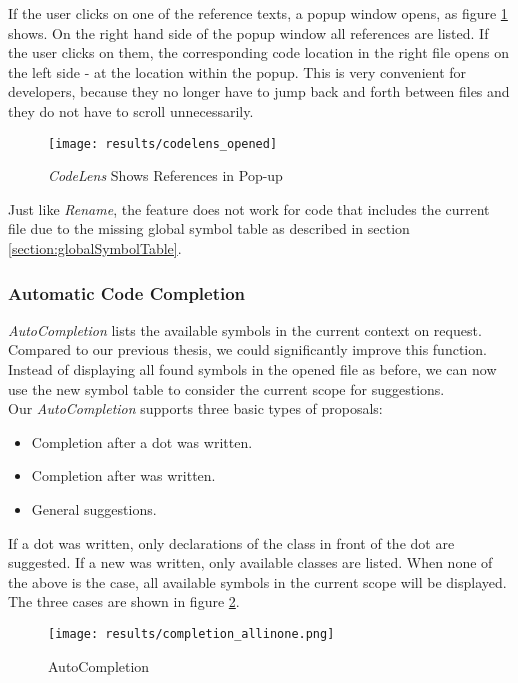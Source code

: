 If the user clicks on one of the reference texts, a popup window opens,
as figure \ref{fig:result_codelens_references_popup} shows.
On the right hand side of the popup window all references are listed.
If the user clicks on them, the corresponding code
location in the right file opens on the left side - at the location within the popup.
This is very convenient for developers,
because they no longer have to jump back and forth between files and they do not have to scroll unnecessarily.

\begin{figure}[H]
    \centering
    \texttt{[image: results/codelens\_opened]}
    \caption{\textit{CodeLens} Shows References in Pop-up}
    \label{fig:result_codelens_references_popup}
\end{figure}

Just like \textit{Rename}, the feature does not work for code that includes the current file
due to the missing global symbol table as described in section \ref{section:globalSymbolTable}.

\subsubsection{Automatic Code Completion}
\textit{AutoCompletion} lists the available symbols in the current context on request.
Compared to our previous thesis, we could significantly improve this function.
Instead of displaying all found symbols in the opened file as before,
we can now use the new symbol table to consider the current scope for suggestions. \\

Our \textit{AutoCompletion} supports three basic types of proposals:
\begin{itemize}
    \item Completion after a dot was written.
    \item Completion after  was written.
    \item General suggestions.
\end{itemize}

If a dot was written, only declarations of the class in front of the dot are suggested.
If a new was written, only available classes are listed.
When none of the above is the case, all available symbols in the current scope will be displayed.
The three cases are shown in figure \ref{fig:result_completion}.

\begin{figure}[H]
    \centering
    \texttt{[image: results/completion\_allinone.png]}
    \caption{AutoCompletion}
    \label{fig:result_completion}
\end{figure}

